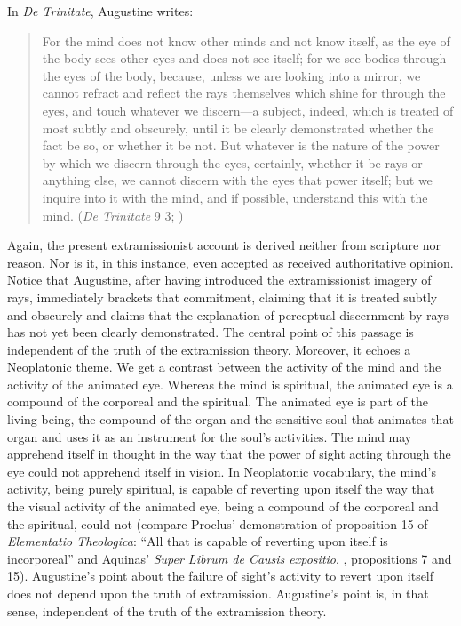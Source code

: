 \documentclass[12pt]{article}
\begin{document}
In \emph{De Trinitate}, Augustine writes:
\begin{quote}
	For the mind does not know other minds and not know itself, as the eye of the body sees other eyes and does not see itself; for we see bodies through the eyes of the body, because, unless we are looking into a mirror, we cannot refract and reflect the rays themselves which shine for through the eyes, and touch whatever we discern---a subject, indeed, which is treated of most subtly and obscurely, until it be clearly demonstrated whether the fact be so, or whether it be not. But whatever is the nature of the power by which we discern through the eyes, certainly, whether it be rays or anything else, we cannot discern with the eyes that power itself; but we inquire into it with the mind, and if possible, understand this with the mind. (\emph{De Trinitate} 9 3; \citealt[226]{Haddan:1873aa})
\end{quote}
Again, the present extramissionist account is derived neither from scripture nor reason. Nor is it, in this instance, even accepted as received authoritative opinion. Notice that Augustine, after having introduced the extramissionist imagery of rays, immediately brackets that commitment, claiming that it is treated subtly and obscurely and claims that the explanation of perceptual discernment by rays has not yet been clearly demonstrated. The central point of this passage is independent of the truth of the extramission theory. Moreover, it echoes a Neoplatonic theme. We get a contrast between the activity of the mind and the activity of the animated eye. Whereas the mind is spiritual, the animated eye is a compound of the corporeal and the spiritual. The animated eye is part of the living being, the compound of the organ and the sensitive soul that animates that organ and uses it as an instrument for the soul's activities. The mind may apprehend itself in thought in the way that the power of sight acting through the eye could not apprehend itself in vision.  In Neoplatonic vocabulary, the mind's activity, being purely spiritual, is capable of reverting upon itself the way that the visual activity of the animated eye, being a compound of the corporeal and the spiritual, could not (compare Proclus' demonstration of proposition 15 of \emph{Elementatio Theologica}: “All that is capable of reverting upon itself is incorporeal” and Aquinas' \emph{Super Librum de Causis expositio}, \citealt{Saffrey:1954aa}, propositions 7 and 15). Augustine's point about the failure of sight's activity to revert upon itself does not depend upon the truth of extramission. Augustine's point is, in that sense, independent of the truth of the extramission theory.
\end{document}
